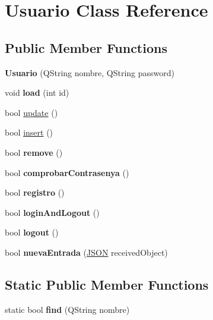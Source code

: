 \hypertarget{classUsuario}{}\section{Usuario Class Reference}
\label{classUsuario}
\subsection*{Public Member Functions}
\begin{DoxyCompactItemize}
\item 
\mbox{\label{classUsuario_a21975acad49ffd19aa3cf818d03527ad}} 
{\bfseries Usuario} (Q\+String nombre, Q\+String password)
\item 
\mbox{\label{classUsuario_a582cfc5fb035575f66240d1784c50632}} 
void {\bfseries load} (int id)
\item 
bool \mbox{\hyperlink{classUsuario_abccc47bddb1deac69920f4dcb7a44b97}{update}} ()
\item 
bool \mbox{\hyperlink{classUsuario_a6adb77ca92414402116ed0256718b227}{insert}} ()
\item 
\mbox{\label{classUsuario_a2e01f0e772aabe9c66ef326eca458405}} 
bool {\bfseries remove} ()
\item 
\mbox{\label{classUsuario_a708f7cbd127ba0f9a91a1b5c681fa5e7}} 
bool {\bfseries comprobar\+Contrasenya} ()
\item 
\mbox{\label{classUsuario_aea05bcbf762bc5c6d1e33990f2c52bf4}} 
bool {\bfseries registro} ()
\item 
\mbox{\label{classUsuario_a03850510ec70df9a5da7f31e66034d8a}} 
bool {\bfseries login\+And\+Logout} ()
\item 
\mbox{\label{classUsuario_a02b402692171dd62745a7fdf82594a70}} 
bool {\bfseries logout} ()
\item 
\mbox{\label{classUsuario_ac3e0282b2dafe69ce640cb8864ad7973}} 
bool {\bfseries nueva\+Entrada} (\mbox{\hyperlink{classnlohmann_1_1basic__json}{J\+S\+ON}} received\+Object)
\end{DoxyCompactItemize}
\subsection*{Static Public Member Functions}
\begin{DoxyCompactItemize}
\item 
\mbox{\label{classUsuario_a713ee3e7e88555c1c0dd58b602328348}} 
static bool {\bfseries find} (Q\+String nombre)
\end{DoxyCompactItemize}
